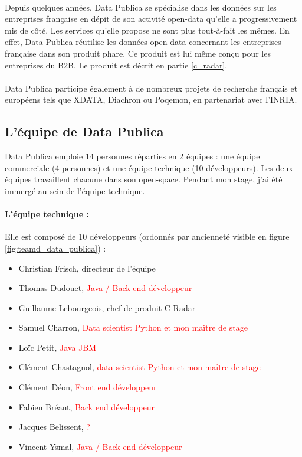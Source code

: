         \paragraph{}
            Depuis quelques années, Data Publica se spécialise dans les données sur les entreprises française en dépit de son activité open-data qu'elle a progressivement mis de côté. Les services qu'elle propose ne sont plus tout-à-fait les mêmes. En effet, Data Publica réutilise les données open-data concernant les entreprises française dans son produit phare. Ce produit est lui même conçu pour les entreprises du B2B. Le produit est décrit en partie \ref{c_radar}.

        \paragraph{}
            Data Publica participe également à de nombreux projets de recherche français et européens tels que XDATA, Diachron ou Poqemon, en partenariat avec l'INRIA.

    \subsection{L'équipe de Data Publica}
        Data Publica emploie 14 personnes réparties en 2 équipes : une équipe commerciale (4 personnes) et une équipe technique (10 développeurs). Les deux équipes travaillent chacune dans son open-space. Pendant mon stage, j'ai été immergé au sein de l'équipe technique.

        \paragraph{L'équipe technique :}
            Elle est composé de 10 développeurs (ordonnés par ancienneté visible en figure \ref{fig:teamd_data_publica}) :
            \begin{itemize}
                \item Christian Frisch, directeur de l'équipe
                \item Thomas Dudouet, \textcolor{red}{Java / Back end développeur}
                \item Guillaume Lebourgeois, chef de produit C-Radar
                \item Samuel Charron, \textcolor{red}{Data scientist Python et mon maître de stage}
                \item Loïc Petit, \textcolor{red}{Java JBM}
                \item Clément Chastagnol, \textcolor{red}{data scientist Python et mon maître de stage}
                \item Clément Déon, \textcolor{red}{Front end développeur}
                \item Fabien Bréant, \textcolor{red}{Back end développeur}
                \item Jacques Belissent, \textcolor{red}{?}
                \item Vincent Ysmal, \textcolor{red}{Java / Back end développeur}
            \end{itemize}

